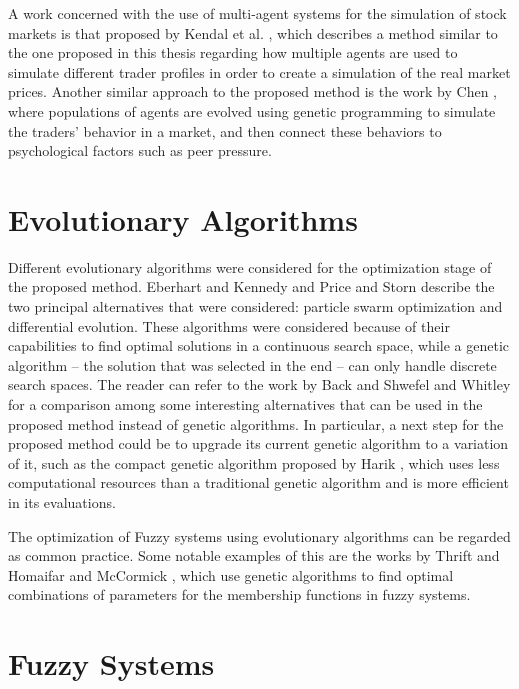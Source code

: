 A work concerned with the use of multi-agent systems for the simulation of stock
markets is that proposed by Kendal et al. \cite{Kendall2003}, which describes a
method similar to the one proposed in this thesis regarding how multiple agents
are used to simulate different trader profiles in order to create a simulation
of the real market prices. Another similar approach to the proposed method is
the work by Chen \cite{Chen2001}, where populations of agents are evolved using
genetic programming to simulate the traders' behavior in a market, and then
connect these behaviors to psychological factors such as peer pressure.

\section{Evolutionary Algorithms}
\label{section:evolutionary-algorithms}

Different evolutionary algorithms were considered for the optimization stage of
the proposed method. Eberhart and Kennedy \cite{Eberhart2002} and Price and
Storn \cite{Price1997} describe the two principal alternatives that were
considered: particle swarm optimization and differential evolution. These
algorithms were considered because of their capabilities to find optimal
solutions in a continuous search space, while a genetic algorithm -- the
solution that was selected in the end -- can only handle discrete search
spaces. The reader can refer to the work by Back and Shwefel \cite{Back2008} and
Whitley \cite{Whitley1994} for a comparison among some interesting alternatives
that can be used in the proposed method instead of genetic algorithms. In
particular, a next step for the proposed method could be to upgrade its current
genetic algorithm to a variation of it, such as the compact genetic algorithm
proposed by Harik \cite{Harik1999}, which uses less computational resources than
a traditional genetic algorithm and is more efficient in its evaluations.

The optimization of Fuzzy systems using evolutionary algorithms can be regarded as
common practice. Some notable examples of this are the works by Thrift
\cite{Thrift1991} and Homaifar and McCormick \cite{Homaifar1995}, which use
genetic algorithms to find optimal combinations of parameters for the membership
functions in fuzzy systems.

\section{Fuzzy Systems}
\label{section:fuzzy-systems}

